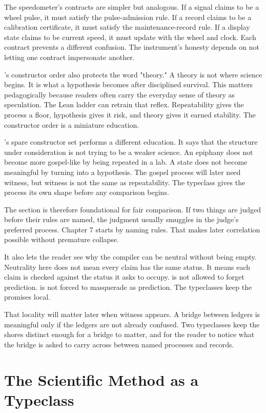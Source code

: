 The speedometer's contracts are simpler but analogous. If a signal claims to be
a wheel pulse, it must satisfy the pulse-admission rule. If a record claims to
be a calibration certificate, it must satisfy the maintenance-record rule. If a
display state claims to be current speed, it must update with the wheel and
clock. Each contract prevents a different confusion. The instrument's honesty
depends on not letting one contract impersonate another.

's constructor order also protects the word "theory." A theory is
not where science begins. It is what a hypothesis becomes after disciplined
survival. This matters pedagogically because readers often carry the everyday
sense of theory as speculation. The Lean ladder can retrain that reflex.
Repeatability gives the process a floor, hypothesis gives it risk, and theory
gives it earned stability. The constructor order is a miniature education.

's spare constructor set performs a different education. It says
that the structure under consideration is not trying to be a weaker science. An
epiphany does not become more gospel-like by being repeated in a lab. A state
does not become meaningful by turning into a hypothesis. The gospel process
will later need witness, but witness is not the same as repeatability. The
typeclass gives the process its own shape before any comparison begins.

The section is therefore foundational for fair comparison. If two things are
judged before their rules are named, the judgment usually smuggles in the
judge's preferred process. Chapter 7 starts by naming rules. That makes later
correlation possible without premature collapse.

It also lets the reader see why the compiler can be neutral without being
empty. Neutrality here does not mean every claim has the same status. It means
each claim is checked against the status it asks to occupy.  is
not allowed to forget prediction.  is not forced to masquerade as
prediction. The typeclasses keep the promises local.

That locality will matter later when witness appears. A bridge between ledgers
is meaningful only if the ledgers are not already confused. Two typeclasses
keep the shores distinct enough for a bridge to matter, and for the reader to
notice what the bridge is asked to carry across between named processes and
records.

\section{The Scientific Method as a Typeclass}
\label{se:scientific-method-typeclass}

